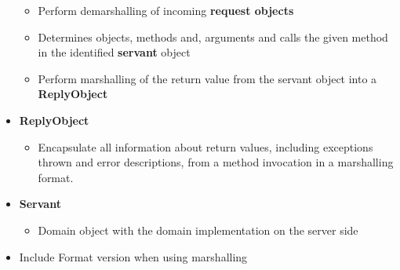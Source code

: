 \documentclass[11pt]{article}
\providecommand{\tightlist}{%
      \setlength{\itemsep}{0pt}\setlength{\parskip}{0pt}}
\begin{document}
\begin{itemize}
  \begin{itemize}
  \tightlist
  \item
    Perform demarshalling of incoming \textbf{request objects}
  \item
    Determines objects, methods and, arguments and calls the given
    method in the identified \textbf{servant} object
  \item
    Perform marshalling of the return value from the servant object into
    a \textbf{ReplyObject}
  \end{itemize}
\item
  \textbf{ReplyObject}

  \begin{itemize}
  \tightlist
  \item
    Encapsulate all information about return values, including
    exceptions thrown and error descriptions, from a method invocation
    in a marshalling format.
  \end{itemize}
\item
  \textbf{Servant}

  \begin{itemize}
  \tightlist
  \item
    Domain object with the domain implementation on the server side
  \end{itemize}
\item
  Include Format version when using marshalling
\end{itemize}
\end{document}

